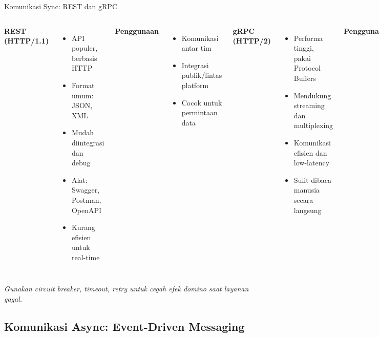 \documentclass[aspectratio=169, table]{beamer}
\begin{document}
\begin{frame}[fragile]{Komunikasi Sync: REST dan gRPC}
	\vspace{20pt}
	\begin{columns}[T]
		\textbf{REST (HTTP/1.1)}
		\begin{itemize}
			\item API populer, berbasis HTTP
			\item Format umum: JSON, XML
			\item Mudah diintegrasi dan debug
			\item Alat: Swagger, Postman, OpenAPI
			\item Kurang efisien untuk real-time
		\end{itemize}
		
		\textbf{Penggunaan}
		\begin{itemize}
			\item Komunikasi antar tim
			\item Integrasi publik/lintas platform
			\item Cocok untuk permintaan data
		\end{itemize}
		
		\textbf{gRPC (HTTP/2)}
		\begin{itemize}
			\item Performa tinggi, pakai Protocol Buffers
			\item Mendukung streaming dan multiplexing
			\item Komunikasi efisien dan low-latency
			\item Sulit dibaca manusia secara langsung
		\end{itemize}
		
		\textbf{Penggunaan}
		\begin{itemize}
			\item Komunikasi internal antarlayanan
			\item Cocok untuk IoT, ML, gaming backend
			\item Real-time, skenario intensif
		\end{itemize}
	\end{columns}
	\vspace{5pt}
	\scriptsize
	\textit{Gunakan circuit breaker, timeout, retry untuk cegah efek domino saat layanan gagal.}
\end{frame}

\subsection{Komunikasi Async: Event-Driven Messaging}
\end{document}

